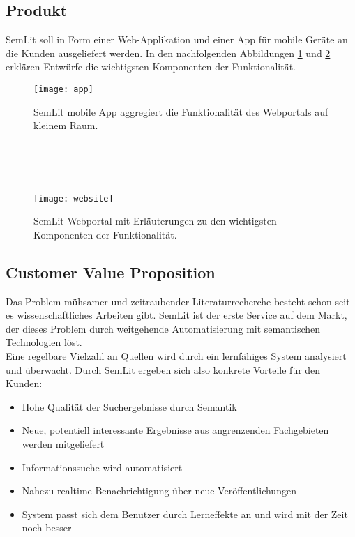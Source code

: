 
\subsection{Produkt}
SemLit soll in Form einer Web-Applikation und einer App für mobile Geräte an die Kunden ausgeliefert werden. In den nachfolgenden Abbildungen \ref{fig:app} und \ref{fig:website} erklären Entwürfe die wichtigsten Komponenten der Funktionalität. 
\\
\begin{figure}[h!]
\centering
\texttt{[image: app]}
\caption{SemLit mobile App aggregiert die Funktionalität des Webportals auf kleinem Raum.}
\label{fig:app}
\end{figure}
\\
\\
\\
\begin{figure}[h!]
\centering
\texttt{[image: website]}
\caption{SemLit Webportal mit Erläuterungen zu den wichtigsten Komponenten der Funktionalität.}
\label{fig:website}
\end{figure}

\newpage

\subsection{Customer Value Proposition}
Das Problem mühsamer und zeitraubender Literaturrecherche besteht schon seit es wissenschaftliches Arbeiten gibt. SemLit ist der erste Service auf dem Markt, der dieses Problem durch weitgehende Automatisierung mit semantischen Technologien löst. 
\\
Eine regelbare Vielzahl an Quellen wird durch ein lernfähiges System analysiert und überwacht. Durch SemLit ergeben sich also konkrete Vorteile für den Kunden:
\begin{itemize}
\item Hohe Qualität der Suchergebnisse durch Semantik
\item Neue, potentiell interessante Ergebnisse aus angrenzenden Fachgebieten werden mitgeliefert
\item Informationssuche wird automatisiert
\item Nahezu-realtime Benachrichtigung über neue Veröffentlichungen
\item System passt sich dem Benutzer durch Lerneffekte an und wird mit der Zeit noch besser
\end{itemize}

